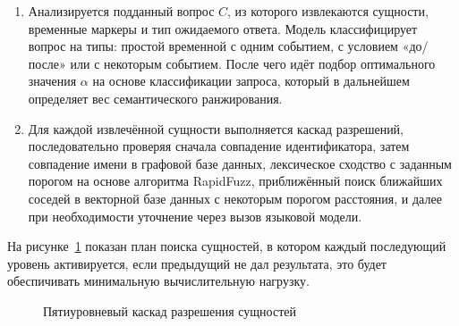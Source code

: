 \begin{enumerate}
    \item[Стадия 1.] Анализируется подданный вопрос $\displaystyle C$, из которого извлекаются сущности, временные маркеры и тип ожидаемого ответа. Модель классифицирует вопрос на типы: простой временной с одним событием, с условием «до/после» или с некоторым событием. После чего идёт подбор оптимального значения $\displaystyle \alpha$ на основе классификации запроса, который в дальнейшем определяет вес семантического ранжирования.

    \item[Стадия 2.] Для каждой извлечённой сущности выполняется каскад разрешений, последовательно проверяя сначала совпадение идентификатора, затем совпадение имени в графовой базе данных, лексическое сходство с заданным порогом на основе алгоритма RapidFuzz, приближённый поиск ближайших соседей в векторной базе данных с некоторым порогом расстояния, и далее при необходимости уточнение через вызов языковой модели. 
\end{enumerate}

На рисунке~\ref{fig:entity_cascade} показан план поиска сущностей, в котором каждый последующий уровень активируется, если предыдущий не дал результата, это будет обеспичивать минимальную вычислительную нагрузку.

\begin{figure}[htbp]
\centering
{}
\caption{Пятиуровневый каскад разрешения сущностей}
\label{fig:entity_cascade}
\end{figure}

